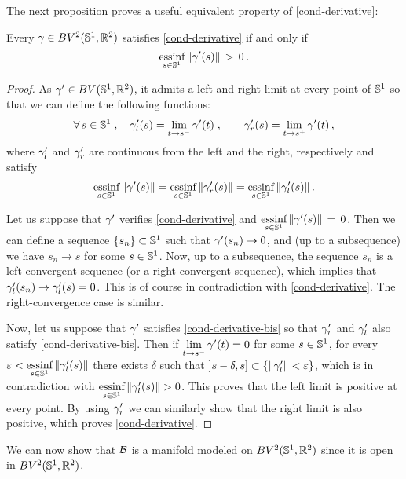 The next proposition proves a useful equivalent property of \eqref{cond-derivative}:
\begin{prop}  Every  $\gamma\in BV^2(\mathbb{S}^1,\mathbb{R}^2)$ satisfies \eqref{cond-derivative} if and only if 
\begin{equation}\label{cond-derivative-bis}
\underset{s\in \mathbb{S}^1}{\mbox{essinf}} \,\|\gamma'(s)\|\,>\,0\,.
\end{equation}

\end{prop}

\begin{proof} As $\gamma'\in BV(\mathbb{S}^1, \mathbb{R}^2)$, it admits a left and right limit at every point of $\mathbb{S}^1$ so that we can define the following functions:
$$\forall\,s\in \mathbb{S}^1\;,\quad \gamma_l'(s) = \underset{t \rightarrow s^-}{\lim}\,\gamma'(t)\;,\quad \quad  \gamma_r'(s) = \underset{t \rightarrow s^+}{\lim}\,\gamma'(t)\,,$$
where $\gamma'_l$ and $\gamma'_r$ are continuous from the left and the right, respectively and satisfy 
$$\underset{s\in \mathbb{S}^1}{\mbox{essinf}} \,\|\gamma'(s)\|= \underset{s\in \mathbb{S}^1}{\mbox{essinf}} \,\|\gamma_r'(s)\|= \underset{s\in \mathbb{S}^1}{\mbox{essinf}} \,\|\gamma_l'(s)\|\,.$$

Let us suppose that  $\gamma'$ verifies \eqref{cond-derivative} and $\underset{s\in \mathbb{S}^1}{\mbox{essinf}} \,\|\gamma'(s)\|\,=\,0$. Then we can define a sequence $\{s_n\}\subset \mathbb{S}^1$ such that $\gamma'(s_n)\to 0$, and (up to a subsequence) we have $s_n\to s$ for some $s\in \mathbb{S}^1$. Now, up to a subsequence, the sequence $s_n$ is a left-convergent sequence (or a right-convergent sequence), which implies that $\gamma'_l(s_n)\to \gamma_l'(s) =0$. This is of course in contradiction with \eqref{cond-derivative}. The right-convergence case is similar.

Now, let us suppose that $\gamma'$ satisfies \eqref{cond-derivative-bis} so that $\gamma'_r$ and $\gamma'_l$ also satisfy \eqref{cond-derivative-bis}. 
Then if $ \underset{t \rightarrow s^-}{\lim}\,\gamma'(t) =0$ for some $s\in \mathbb{S}^1$, for  every $\varepsilon <  \underset{s\in \mathbb{S}^1}{\mbox{essinf}} \,\|\gamma_l'(s)\|$ there exists $\delta$ such that $]s-\delta,s]\subset \{\|\gamma'_l\|<\varepsilon\}$, which is in contradiction  with $\underset{s\in \Circ}{\mbox{essinf}} \,\|\gm_l'(s)\|>0$. This proves that the left limit is positive at every point. By using $\gamma'_r$ we can similarly show that the right limit is also positive, which proves \eqref{cond-derivative}.
\end{proof}
We can now show that $\mathcal{B}$ is  a manifold modeled on $BV^2(\mathbb{S}^1,\mathbb{R}^2)$ since it is open in $BV^2(\mathbb{S}^1,\mathbb{R}^2)$.


